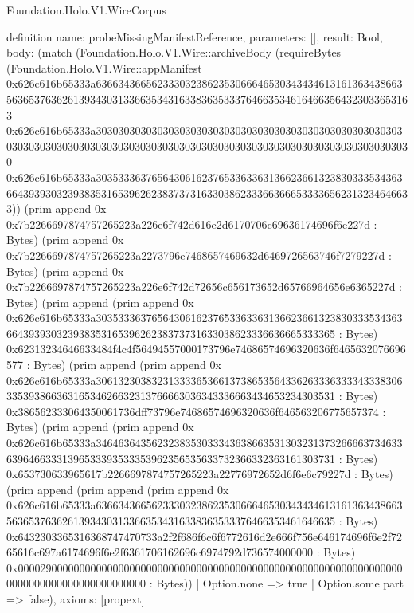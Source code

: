\begin{lexlean}{Foundation.Holo.V1.WireCorpus}
\begin{semanticmodule}
definition{
  name: probeMissingManifestReference,
  parameters: [],
  result: Bool,
  body: (match (Foundation.Holo.V1.Wire::archiveBody (requireBytes (Foundation.Holo.V1.Wire::appManifest 0x626c616b65333a63663436656233303238623530666465303434346131613634386635636537636261393430313366353431633836353337646635346164663564323033653163 0x626c616b65333a30303030303030303030303030303030303030303030303030303030303030303030303030303030303030303030303030303030303030303030303030303030 0x626c616b65333a30353336376564306162376533633631366236613238303335343636643939303239383531653962623837373163303862333663666533336562313234646633)) (prim append 0x 0x7b2266697874757265223a226e6f742d616e2d6170706c69636174696f6e227d : Bytes) (prim append 0x 0x7b2266697874757265223a2273796e7468657469632d6469726563746f7279227d : Bytes) (prim append 0x 0x7b2266697874757265223a226e6f742d72656c656173652d65766964656e6365227d : Bytes) (prim append (prim append 0x 0x626c616b65333a303533363765643061623765336336313662366132383033353436366439393032393835316539626238373731633038623336636665333365 : Bytes) 0x62313234646633484f4c4f56494557000173796e74686574696320636f6465632076696577 : Bytes) (prim append (prim append 0x 0x626c616b65333a306132303832313333653661373865356433626333633334333830633539386636316534626632313766663036343336663434653234303531 : Bytes) 0x386562333064350061736dff73796e74686574696320636f646563206775657374 : Bytes) (prim append (prim append 0x 0x626c616b65333a346463643562323835303334363866353130323137326666373463363964663331396533393533353962356535633732366332363161303731 : Bytes) 0x653730633965617b2266697874757265223a22776972652d6f6e6c79227d : Bytes) (prim append (prim append (prim append 0x 0x626c616b65333a636634366562333032386235306664653034343461316136343866356365376362613934303133663534316338363533376466353461646635 : Bytes) 0x6432303365316368747470733a2f2f686f6c6f6772616d2e666f756e646174696f6e2f7265616c697a6174696f6e2f6361706162696c6974792d736574000000 : Bytes) 0x0000290000000000000000000000000000000000000000000000000000000000000000000000000000000000000000 : Bytes))
    | Option.none => true
    | Option.some part => false),
  axioms: [propext]
}


\end{semanticmodule}
\end{lexlean}

